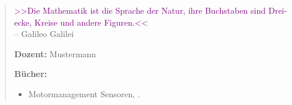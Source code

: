 \null\vfil
\begin{otherlanguage}{ngerman}
\begin{center}\textsf{\textbf{\abstractname}}\end{center}


    \begin{quote}
        \textcolor{purple}{>>Die Mathematik ist die Sprache der Natur, 
        ihre Buchstaben sind Dreiecke, Kreise und andere Figuren.<<}\\ 
        \raggedleft \small{-- Galileo Galilei}%
        
        \raggedright
        \textbf{Dozent:} Mustermann

        \textbf{Bücher:}

        \begin{itemize}
            \item Motormanagement Sensoren, \textcite{schneehage:2021:motormanagement}.
        \end{itemize}


    \end{quote}

\end{otherlanguage}
\vfil\null



